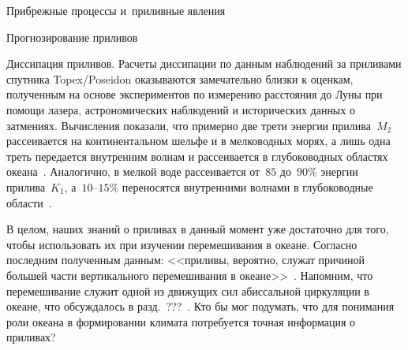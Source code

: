 \begin{chapter}{Прибрежные процессы и~приливные явления}
\begin{section}{Прогнозирование приливов}
\begin{paragraph}{Диссипация приливов.}
Расчеты диссипации по данным наблюдений за приливами спутника
Topex/Poseidon
оказываются замечательно близки к оценкам, полученным на основе
экспериментов по измерению расстояния до Луны при помощи лазера, 
астрономических наблюдений и исторических данных о затмениях.
Вычисления показали, что примерно две трети энергии прилива~$M_2$ 
рассеивается на континентальном шельфе и в мелководных морях, а лишь
одна треть передается внутренним волнам и рассеивается в глубоководных
областях океана~\cite{Egbert:2000}. 
Аналогично, в мелкой воде рассеивается от~$85$ до~$90\%$ энергии прилива~$K_1$,
а~$10$--$15\%$ переносятся внутренними волнами в глубоководные 
области~\cite{LeProvost:2003}.
%

В целом, наших знаний о приливах в данный момент уже достаточно для того,
чтобы использовать их при изучении перемешивания
в океане. Согласно последним полученным данным: <<приливы, вероятно, служат
причиной большей части вертикального перемешивания в 
океане>>~\cite{Jayne:2004}. Напомним, что перемешивание служит одной из
движущих сил абиссальной циркуляции%
в океане, что обсуждалось в разд.~???~\cite{Munk:1998}. 
Кто бы мог подумать, что для понимания роли океана в формировании климата
потребуется точная информация о приливах?
%
\end{paragraph}
\end{section}


\end{chapter}
